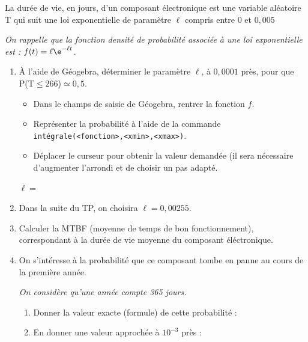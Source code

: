 	\begin{exercice_cours}[\quad]{}


La durée de vie, en jours, d’un composant électronique est une variable aléatoire T qui suit une loi exponentielle de paramètre $\ell$ compris entre $0$ et $0,005$

{\it On rappelle que la fonction densité de probabilité associée à une loi exponentielle est : $f(t)=\ell\e^{-\ell t}$.}\\

\begin{enumerate}
	\item À l'aide de Géogebra, déterminer le paramètre $\ell$, à $0,0001$ près, pour que P(T$\leq266$)$ \simeq 0,5$.
	
	{\it \begin{itemize}
		\item Dans le champs de saisie de Géogebra, rentrer la fonction $f$.
		\item Représenter la probabilité à l'aide de la commande \texttt{intégrale(<fonction>,<xmin>,<xmax>)}.
		\item Déplacer le curseur pour obtenir la valeur demandée (il sera nécessaire d'augmenter l'arrondi et de choisir un pas adapté.
		\end{itemize}}
	
	$\ell = $\makebox[0.1\linewidth]{\dotfill} \hfill {}
	\item[~] Dans la suite du TP, on choisira $\ell = 0,00255$.
	
	\item Calculer la MTBF (moyenne de temps de bon fonctionnement), correspondant à la durée de vie moyenne du composant éléctronique.\\
	
	\dotfill
	
	\smallskip
	\item On s'intéresse à la probabilité que ce composant tombe en panne au cours de la première année.
	
	{\it On considère qu’une année compte 365 jours.}
	
	\begin{enumerate}
		\item Donner la valeur exacte (formule) de cette probabilité : \dotfill \\
		
		\item En donner une valeur approchée à $10^{-3}$ près : \dotfill
		

\end{enumerate}
\end{enumerate}
\end{exercice_cours}
